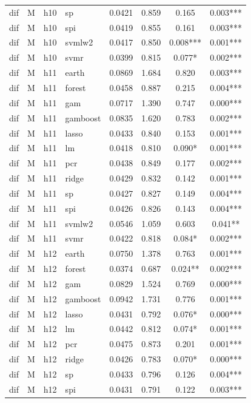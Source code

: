 \begin{ThreePartTable}
\begin{longtable}[t]{llclcccc}
dif & M & h10 & sp & 0.0421 & 0.859 & 0.165 & 0.003***\\
dif & M & h10 & spi & 0.0419 & 0.855 & 0.161 & 0.003***\\
dif & M & h10 & svmlw2 & 0.0417 & 0.850 & 0.008*** & 0.001***\\
dif & M & h10 & svmr & 0.0399 & 0.815 & 0.077* & 0.002***\\
\addlinespace
dif & M & h11 & earth & 0.0869 & 1.684 & 0.820 & 0.003***\\
dif & M & h11 & forest & 0.0458 & 0.887 & 0.215 & 0.004***\\
dif & M & h11 & gam & 0.0717 & 1.390 & 0.747 & 0.000***\\
dif & M & h11 & gamboost & 0.0835 & 1.620 & 0.783 & 0.002***\\
dif & M & h11 & lasso & 0.0433 & 0.840 & 0.153 & 0.001***\\
dif & M & h11 & lm & 0.0418 & 0.810 & 0.090* & 0.001***\\
dif & M & h11 & pcr & 0.0438 & 0.849 & 0.177 & 0.002***\\
dif & M & h11 & ridge & 0.0429 & 0.832 & 0.142 & 0.001***\\
dif & M & h11 & sp & 0.0427 & 0.827 & 0.149 & 0.004***\\
dif & M & h11 & spi & 0.0426 & 0.826 & 0.143 & 0.004***\\
dif & M & h11 & svmlw2 & 0.0546 & 1.059 & 0.603 & 0.041**\\
dif & M & h11 & svmr & 0.0422 & 0.818 & 0.084* & 0.002***\\
\addlinespace
dif & M & h12 & earth & 0.0750 & 1.378 & 0.763 & 0.001***\\
dif & M & h12 & forest & 0.0374 & 0.687 & 0.024** & 0.002***\\
dif & M & h12 & gam & 0.0829 & 1.524 & 0.769 & 0.000***\\
dif & M & h12 & gamboost & 0.0942 & 1.731 & 0.776 & 0.001***\\
dif & M & h12 & lasso & 0.0431 & 0.792 & 0.076* & 0.000***\\
dif & M & h12 & lm & 0.0442 & 0.812 & 0.074* & 0.001***\\
dif & M & h12 & pcr & 0.0475 & 0.873 & 0.201 & 0.001***\\
dif & M & h12 & ridge & 0.0426 & 0.783 & 0.070* & 0.000***\\
dif & M & h12 & sp & 0.0433 & 0.796 & 0.126 & 0.004***\\
dif & M & h12 & spi & 0.0431 & 0.791 & 0.122 & 0.003***\\

\end{longtable}
\end{ThreePartTable}
